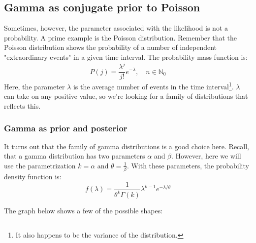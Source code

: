 \documentclass[12pt, a4paper]{article}
\begin{document}
\subsection{Gamma as conjugate prior to Poisson}
Sometimes, however, the parameter associated with the likelihood is not a probability. A prime example is the Poisson distribution. Remember that the Poisson distribution shows the probability of a number of independent "extraordinary events" in a given time interval. The probability mass function is:
\begin{equation}
P(j)=\frac{\lambda^j}{j!}e^{-\lambda},\quad n\in\mathbb{N}_0
\end{equation}
Here, the parameter $\lambda$ is the average number of events in the time interval\footnote{It also happens to be the variance of the distribution.}. $\lambda$ can take on any positive value, so we're looking for a family of distributions that reflects this.

\subsubsection{Gamma as prior and posterior}
It turns out that the family of gamma distributions is a good choice here. Recall, that a gamma distribution has two parameters $\alpha$ and $\beta$. However, here we will use the parametrization $k=\alpha$ and $\theta=\frac{1}{\beta}$. With these parameters, the probability density function is:
\begin{equation}
\label{gamma}
f(\lambda)=\frac{1}{\theta^k \Gamma(k)}\lambda^{k-1}e^{-\lambda/\theta}
\end{equation}

The graph below shows a few of the possible shapes:

\end{document}
